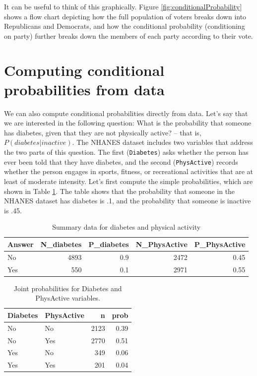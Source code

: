 \documentclass[
  12pt,
]{book}
\begin{document}
It can be useful to think of this graphically. Figure \ref{fig:conditionalProbability} shows a flow chart depicting how the full population of voters breaks down into Republicans and Democrats, and how the conditional probability (conditioning on party) further breaks down the members of each party according to their vote.

\hypertarget{computing-conditional-probabilities-from-data}{%
\section{Computing conditional probabilities from data}\label{computing-conditional-probabilities-from-data}}

We can also compute conditional probabilities directly from data. Let's say that we are interested in the following question: What is the probability that someone has diabetes, given that they are not physically active? -- that is, \(P(diabetes|inactive)\). The NHANES dataset includes two variables that address the two parts of this question. The first (\texttt{Diabetes}) asks whether the person has ever been told that they have diabetes, and the second (\texttt{PhysActive}) records whether the person engages in sports, fitness, or recreational activities that are at least of moderate intensity. Let's first compute the simple probabilities, which are shown in Table \ref{tab:simpleProb}. The table shows that the probability that someone in the NHANES dataset has diabetes is .1, and the probability that someone is inactive is .45.

\begin{table}

\caption{\label{tab:simpleProb}Summary data for diabetes and physical activity}
\centering
\begin{tabular}[t]{l|r|r|r|r}
\hline
Answer & N\_diabetes & P\_diabetes & N\_PhysActive & P\_PhysActive\\
\hline
No & 4893 & 0.9 & 2472 & 0.45\\
\hline
Yes & 550 & 0.1 & 2971 & 0.55\\
\hline
\end{tabular}
\end{table}

\begin{table}

\caption{\label{tab:jointProb}Joint probabilities for Diabetes and PhysActive variables.}
\centering
\begin{tabular}[t]{l|l|r|r}
\hline
Diabetes & PhysActive & n & prob\\
\hline
No & No & 2123 & 0.39\\
\hline
No & Yes & 2770 & 0.51\\
\hline
Yes & No & 349 & 0.06\\
\hline
Yes & Yes & 201 & 0.04\\
\hline
\end{tabular}
\end{table}
\end{document}
